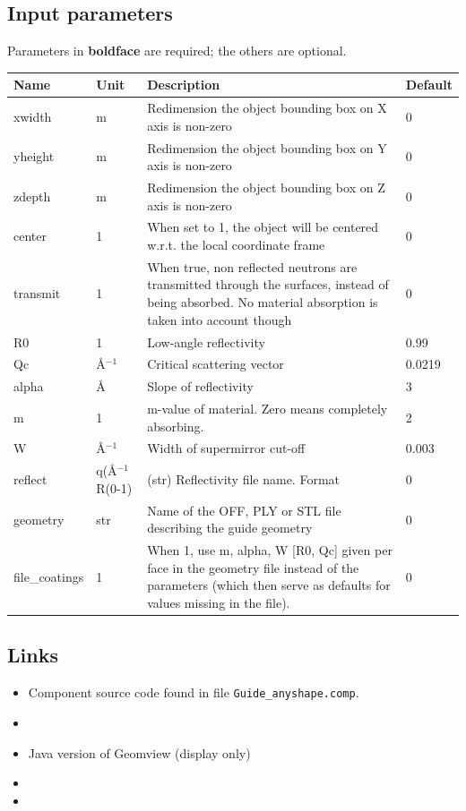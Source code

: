 \subsection*{Input parameters}
Parameters in \textbf{boldface} are required; the others are optional.

\begin{longtable}{p{}p{}p{}p{}}
\toprule
\textbf{Name} & \textbf{Unit} & \textbf{Description} & \textbf{Default} \\
\midrule
\endhead
xwidth & m & Redimension the object bounding box on X axis is non-zero & 0 \\
yheight & m & Redimension the object bounding box on Y axis is non-zero & 0 \\
zdepth & m & Redimension the object bounding box on Z axis is non-zero & 0 \\
center & 1 & When set to 1, the object will be centered w.r.t. the local coordinate frame & 0 \\
transmit & 1 & When true, non reflected neutrons are transmitted through the surfaces, instead of being absorbed. No material absorption is taken into account though & 0 \\
R0 & 1 & Low-angle reflectivity & 0.99 \\
Qc & \AA{}$^{-1}$ & Critical scattering vector & 0.0219 \\
alpha & \AA{} & Slope of reflectivity & 3 \\
m & 1 & m-value of material. Zero means completely absorbing. & 2 \\
W & \AA{}$^{-1}$ & Width of supermirror cut-off & 0.003 \\
reflect & q(\AA{}$^{-1}$ R(0-1) & (str)  Reflectivity file name. Format & 0 \\
geometry & str & Name of the OFF, PLY or STL file describing the guide geometry & 0 \\
file\_coatings & 1 & When 1, use m, alpha, W [R0, Qc] given per face in the geometry file instead of the parameters (which then serve as defaults for values missing in the file). & 0 \\
\bottomrule
\end{longtable}

\subsection*{Links}
\begin{itemize}
  \item Component source code found in file \texttt{Guide\_anyshape.comp}.
  \item {}
  \item Java version of Geomview (display only) 
  \item {}
  \item {}
\end{itemize}
